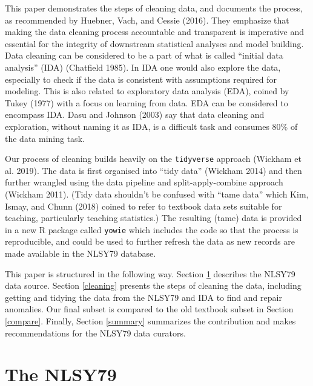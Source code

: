 \documentclass{article}
\begin{document}
This paper demonstrates the steps of cleaning data, and documents the process, as recommended by Huebner, Vach, and Cessie (2016). They emphasize that making the data cleaning process accountable and transparent is imperative and essential for the integrity of downstream statistical analyses and model building. Data cleaning can be considered to be a part of what is called ``initial data analysis'' (IDA) (Chatfield 1985). In IDA one would also explore the data, especially to check if the data is consistent with assumptions required for modeling. This is also related to exploratory data analysis (EDA), coined by Tukey (1977) with a focus on learning from data. EDA can be considered to encompass IDA. Dasu and Johnson (2003) say that data cleaning and exploration, without naming it as IDA, is a difficult task and consumes 80\% of the data mining task.

Our process of cleaning builds heavily on the \texttt{tidyverse} approach (Wickham et al. 2019). The data is first organised into ``tidy data'' (Wickham 2014) and then further wrangled using the data pipeline and split-apply-combine approach (Wickham 2011). (Tidy data shouldn't be confused with ``tame data'' which Kim, Ismay, and Chunn (2018) coined to refer to textbook data sets suitable for teaching, particularly teaching statistics.) The resulting (tame) data is provided in a new R package called \texttt{yowie} which includes the code so that the process is reproducible, and could be used to further refresh the data as new records are made available in the NLSY79 database.

This paper is structured in the following way. Section \ref{database} describes the NLSY79 data source. Section \ref{cleaning} presents the steps of cleaning the data, including getting and tidying the data from the NLSY79 and IDA to find and repair anomalies. Our final subset is compared to the old textbook subset in Section \ref{compare}. Finally, Section \ref{summary} summarizes the contribution and makes recommendations for the NLSY79 data curators.

\hypertarget{database}{%
\section{The NLSY79}\label{database}}
\end{document}
